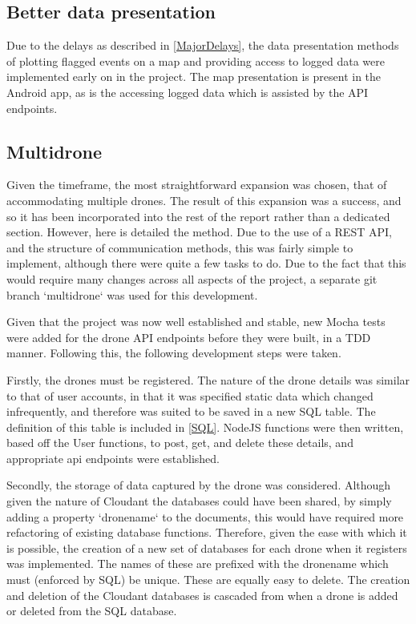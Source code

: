 \documentclass{article}
\begin{document}
\subsection{Better data presentation}
Due to the delays as described in \ref{MajorDelays}, the data presentation methods of plotting flagged events on a map and providing access to logged data were implemented early on in the project. The map presentation is present in the Android app, as is the accessing logged data which is assisted by the API endpoints. 

\subsection{Multidrone}
Given the timeframe, the most straightforward expansion was chosen, that of accommodating multiple drones. The result of this expansion was a success, and so it has been incorporated into the rest of the report rather than a dedicated section. However, here is detailed the method. Due to the use of a REST API, and the structure of communication methods, this was fairly simple to implement, although there were quite a few tasks to do. Due to the fact that this would require many changes across all aspects of the project, a separate git branch `multidrone` was used for this development. 

Given that the project was now well established and stable, new Mocha tests were added for the drone API endpoints before they were built, in a TDD manner. Following this, the following development steps were taken. 

Firstly, the drones must be registered. The nature of the drone details was similar to that of user accounts, in that it was specified static data which changed infrequently, and therefore was suited to be saved in a new SQL table. The definition of this table is included in \ref{SQL}. NodeJS functions were then written, based off the User functions, to post, get, and delete these details, and appropriate api endpoints were established. 

Secondly, the storage of data captured by the drone was considered. Although given the nature of Cloudant the databases could have been shared, by simply adding a property `dronename` to the documents, this would have required more refactoring of existing database functions. Therefore, given the ease with which it is possible, the creation of a new set of databases for each drone when it registers was implemented. The names of these are prefixed with the dronename which must (enforced by SQL) be unique. These are equally easy to delete. The creation and deletion of the Cloudant databases is cascaded from when a drone is added or deleted from the SQL database. 
\end{document}
